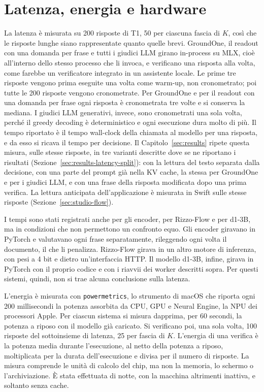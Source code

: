 \section{Latenza, energia e hardware}
\label{sec:setup-protocol}

La latenza è misurata su 200 risposte di T1, 50 per ciascuna fascia di $K$, così che le risposte lunghe siano
rappresentate quanto quelle brevi. GroundOne, il readout con una domanda per frase e tutti i giudici LLM girano
in-process su MLX, cioè all'interno dello stesso processo che li invoca, e verificano una risposta alla volta, come
farebbe un verificatore integrato in un assistente locale. Le prime tre risposte vengono prima eseguite una volta come warm-up, non cronometrato; poi tutte le 200 risposte vengono cronometrate. Per GroundOne e per il readout con una domanda per frase ogni risposta è cronometrata tre volte e si conserva la mediana. I giudici LLM
generativi, invece, sono cronometrati una sola volta, perché il greedy decoding è deterministico e ogni esecuzione dura
molto di più. Il tempo riportato è il tempo wall-clock della chiamata al modello per una risposta, e da esso si ricava il tempo per decisione. Il Capitolo~\ref{sec:results} ripete questa misura, sulle stesse risposte, in tre varianti descritte dove se ne riportano i risultati (Sezione~\ref{sec:results-latency-split}): con la lettura del testo separata dalla decisione, con una parte del prompt già nella KV cache, la stessa per GroundOne e per i giudici LLM, e con una frase della risposta modificata dopo una prima verifica. La lettura anticipata dell'applicazione è misurata in Swift sulle stesse risposte (Sezione~\ref{sec:studio-flow}).

I tempi sono stati registrati anche per gli encoder, per Rizzo-Flow e per d1-3B, ma in condizioni che non permettono un
confronto equo. Gli encoder giravano in PyTorch e valutavano ogni frase separatamente, rileggendo ogni volta il
documento, il che li penalizza. Rizzo-Flow girava in un altro motore di inferenza, con pesi a 4 bit e dietro
un'interfaccia HTTP. Il modello d1-3B, infine, girava in PyTorch con il proprio codice e con i riavvii dei worker
descritti sopra. Per questi sistemi, quindi, non si trae alcuna conclusione sulla latenza.

L'energia è misurata con \texttt{powermetrics}, lo strumento di macOS che riporta ogni 200 millisecondi la potenza
assorbita da CPU, GPU e Neural Engine, la NPU dei processori Apple. Per ciascun sistema si misura dapprima, per 60
secondi, la potenza a riposo con il modello già caricato. Si verificano poi, una sola volta, 100 risposte del
sottoinsieme di latenza, 25 per fascia di $K$. L'energia di una verifica è la potenza media durante l'esecuzione, al
netto della potenza a riposo, moltiplicata per la durata dell'esecuzione e divisa per il numero di risposte. La misura
comprende le unità di calcolo del chip, ma non la memoria, lo schermo o l'archiviazione. È stata effettuata di notte, con la macchina altrimenti inattiva, e soltanto senza cache.

